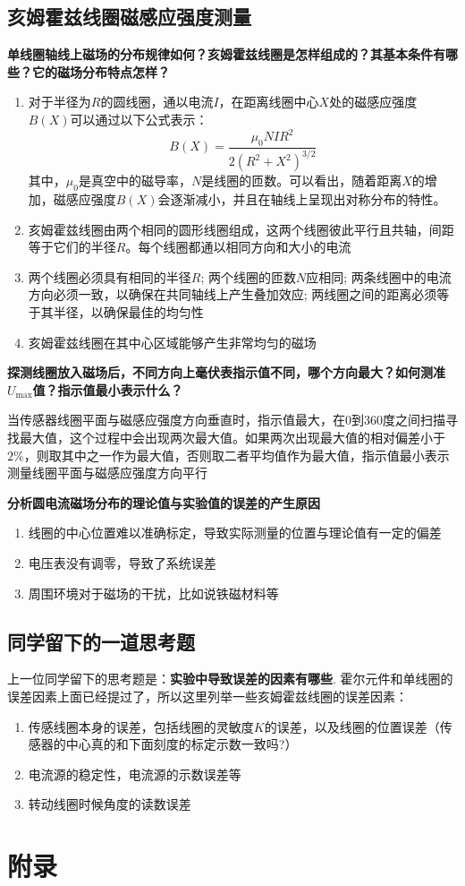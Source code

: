\documentclass[zihao=5, UTF8]{article}
\theoremstyle{MyLineTheoremStyle} %
\theoremstyle{MyBlockTheoremStyle} %
\theoremstyle{MySubsubsectionStyle} %
\begin{document}
\subsection{亥姆霍兹线圈磁感应强度测量}
\textbf{单线圈轴线上磁场的分布规律如何？亥姆霍兹线圈是怎样组成的？其基本条件有哪些？它的磁场分布特点怎样？}
\begin{enumerate}
    \item 对于半径为$R$的圆线圈，通以电流$I$，在距离线圈中心$X$处的磁感应强度$B(X)$可以通过以下公式表示：
\[
B(X) = \frac{\mu_0 N I R^2}{2(R^2 + X^2)^{3/2}}
\]
其中，$\mu_0$是真空中的磁导率，$N$是线圈的匝数。可以看出，随着距离$X$的增加，磁感应强度$B(X)$会逐渐减小，并且在轴线上呈现出对称分布的特性。
    \item 亥姆霍兹线圈由两个相同的圆形线圈组成，这两个线圈彼此平行且共轴，间距等于它们的半径$R$。每个线圈都通以相同方向和大小的电流
    \item 两个线圈必须具有相同的半径$R$; 两个线圈的匝数$N$应相同; 两条线圈中的电流方向必须一致，以确保在共同轴线上产生叠加效应; 两线圈之间的距离必须等于其半径，以确保最佳的均匀性
    \item 亥姆霍兹线圈在其中心区域能够产生非常均匀的磁场
\end{enumerate}

\textbf{探测线圈放入磁场后，不同方向上毫伏表指示值不同，哪个方向最大？如何测准$U_\mathrm{max}$值？指示值最小表示什么？}

当传感器线圈平面与磁感应强度方向垂直时，指示值最大，在0到360度之间扫描寻找最大值，这个过程中会出现两次最大值。如果两次出现最大值的相对偏差小于$2\%$，则取其中之一作为最大值，否则取二者平均值作为最大值，指示值最小表示测量线圈平面与磁感应强度方向平行

\textbf{分析圆电流磁场分布的理论值与实验值的误差的产生原因}

\begin{enumerate}
    \item 线圈的中心位置难以准确标定，导致实际测量的位置与理论值有一定的偏差
    \item 电压表没有调零，导致了系统误差
    \item 周围环境对于磁场的干扰，比如说铁磁材料等
\end{enumerate}
\subsection{同学留下的一道思考题}
上一位同学留下的思考题是：\textbf{实验中导致误差的因素有哪些}. 霍尔元件和单线圈的误差因素上面已经提过了，所以这里列举一些亥姆霍兹线圈的误差因素：
\begin{enumerate}
    \item 传感线圈本身的误差，包括线圈的灵敏度$K$的误差，以及线圈的位置误差（传感器的中心真的和下面刻度的标定示数一致吗?）
    \item 电流源的稳定性，电流源的示数误差等
    \item 转动线圈时候角度的读数误差
\end{enumerate}
\section{附录}


\end{document}
